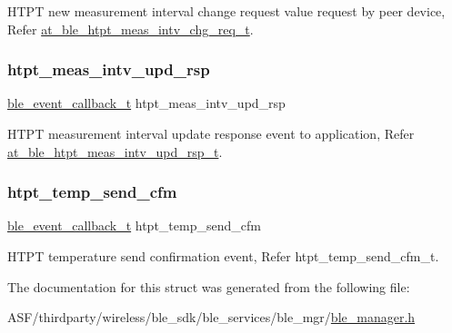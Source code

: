 H\+T\+PT new measurement interval change request value request by peer device, Refer \mbox{\hyperlink{structat__ble__htpt__meas__intv__chg__req__t}{at\+\_\+ble\+\_\+htpt\+\_\+meas\+\_\+intv\+\_\+chg\+\_\+req\+\_\+t}}. 

\mbox{\label{structble__htpt__event__cb_a28e05ac5664ac4de693b9a1e22c9c011}} 
\subsubsection{\texorpdfstring{htpt\_meas\_intv\_upd\_rsp}{htpt\_meas\_intv\_upd\_rsp}}
{\footnotesize\ttfamily \mbox{\hyperlink{ble__manager_8h_a04ce4bb8cb8282f2762e3924b1773cc9}{ble\+\_\+event\+\_\+callback\+\_\+t}} htpt\+\_\+meas\+\_\+intv\+\_\+upd\+\_\+rsp}



H\+T\+PT measurement interval update response event to application, Refer \mbox{\hyperlink{structat__ble__htpt__meas__intv__upd__rsp__t}{at\+\_\+ble\+\_\+htpt\+\_\+meas\+\_\+intv\+\_\+upd\+\_\+rsp\+\_\+t}}. 

\mbox{\label{structble__htpt__event__cb_aa135bc9fb13a0697380ccbfcfb42c0b9}} 
\subsubsection{\texorpdfstring{htpt\_temp\_send\_cfm}{htpt\_temp\_send\_cfm}}
{\footnotesize\ttfamily \mbox{\hyperlink{ble__manager_8h_a04ce4bb8cb8282f2762e3924b1773cc9}{ble\+\_\+event\+\_\+callback\+\_\+t}} htpt\+\_\+temp\+\_\+send\+\_\+cfm}



H\+T\+PT temperature send confirmation event, Refer htpt\+\_\+temp\+\_\+send\+\_\+cfm\+\_\+t. 



The documentation for this struct was generated from the following file\+:\begin{DoxyCompactItemize}
\item 
A\+S\+F/thirdparty/wireless/ble\+\_\+sdk/ble\+\_\+services/ble\+\_\+mgr/\mbox{\hyperlink{ble__manager_8h}{ble\+\_\+manager.\+h}}\end{DoxyCompactItemize}
